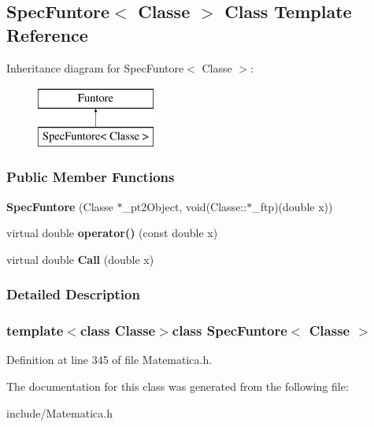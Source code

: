 \hypertarget{classSpecFuntore}{\subsection{\-Spec\-Funtore$<$ \-Classe $>$ \-Class \-Template \-Reference}
\label{classSpecFuntore}
}
\-Inheritance diagram for \-Spec\-Funtore$<$ \-Classe $>$\-:\begin{figure}[H]
\begin{center}
\leavevmode
\includegraphics[height=2.000000cm]{classSpecFuntore}
\end{center}
\end{figure}
\subsubsection*{\-Public \-Member \-Functions}
\begin{DoxyCompactItemize}
\item 
\hypertarget{classSpecFuntore_aa876c38dd3e977523349978219f78810}{{\bfseries \-Spec\-Funtore} (\-Classe $\ast$\-\_\-pt2\-Object, void(\-Classe\-::$\ast$\-\_\-ftp)(double x))}\label{classSpecFuntore_aa876c38dd3e977523349978219f78810}

\item 
\hypertarget{classSpecFuntore_ad1b56a9087ec7ac49e01550c4db05cf9}{virtual double {\bfseries operator()} (const double x)}\label{classSpecFuntore_ad1b56a9087ec7ac49e01550c4db05cf9}

\item 
\hypertarget{classSpecFuntore_a38eee419ace8dfb106b346696cc54510}{virtual double {\bfseries \-Call} (double x)}\label{classSpecFuntore_a38eee419ace8dfb106b346696cc54510}

\end{DoxyCompactItemize}


\subsubsection{\-Detailed \-Description}
\subsubsection*{template$<$class Classe$>$class Spec\-Funtore$<$ Classe $>$}



\-Definition at line 345 of file \-Matematica.\-h.



\-The documentation for this class was generated from the following file\-:\begin{DoxyCompactItemize}
\item 
include/\-Matematica.\-h\end{DoxyCompactItemize}
